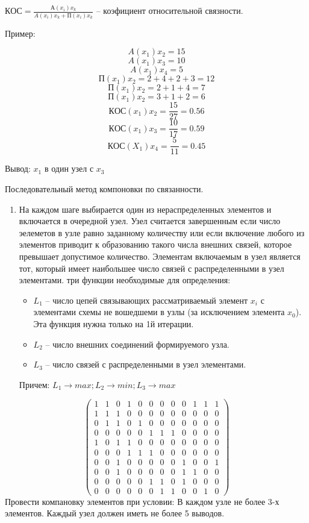 \documentclass{article}
\begin{document}
	$КОС = \frac{А (x_i) x_k}{A (x_i) x_k + П (x_i) x_k} $ -- коэфициент относительной связности.
	

	Пример:

	$$
	A (x_1) x_2 = 15
	$$
	$$
	A(x_1) x_3 = 10
	$$
	$$
	A(x_1) x_4 = 5
	$$
	$$
	П(x_1) x_2 = 2 + 4 + 2 + 3 = 12
	$$
	$$
	П (x_1) x_2 = 2 + 1 + 4 = 7
	$$
	$$
	П (x_1) x_2 = 3 + 1 + 2 = 6
	$$
	$$
	КОС (x_1) x_2 = \frac{15}{27} = 0.56
	$$
	$$
	КОС (x_1) x_3 = \frac{10}{17} = 0.59
	$$
	$$
	КОС (X_1) x_4 = \frac{5}{11} = 0.45
	$$

	Вывод: $x_1$ в один узел с $x_3$

	Последовательный метод компоновки по связанности.

	\begin{enumerate}
		\item На каждом шаге выбирается один из нераспределенных элементов и включается в очередной узел. Узел считается завершенным если число эелеметов в узле равно заданному количеству или если включение любого из элементов приводит к образованию такого числа внешних связей, которое превышает допустимое количество. Элементам включаемым в узел является тот, который имеет наибольшее число связей с распределенными в узел элементами. три функции необходимые для определения:
		\begin{itemize}
			\item $L_1$ -- число цепей связывающих рассматриваемый элемент $x_i$ с элементами схемы не вошедшеми в узлы (за исключением элемента $x_0$). Эта функция нужна только на 1й итерации.
			\item $L_2$ -- число внешних соединений формируемого узла.
			\item $L_3$ -- число связей с распределенными в узел элементами.
		\end{itemize}
		Причем: $L_1 \to max; L_2 \to min; L_3 \to max$
	\end{enumerate}
	$$
	\begin{pmatrix}
		1 & 1 & 0 & 1 & 0 & 0 & 0 & 0 & 0 & 1 & 1 & 1\\
		1 & 1 & 1 & 0 & 0 & 0 & 0 & 0 & 0 & 0 & 0 & 0\\
		0 & 1 & 1 & 0 & 1 & 0 & 0 & 0 & 0 & 0 & 0 & 0\\
		0 & 0 & 0 & 0 & 0 & 1 & 1 & 1 & 0 & 0 & 0 & 0\\
		1 & 0 & 1 & 1 & 0 & 0 & 0 & 0 & 0 & 0 & 0 & 0\\
		0 & 0 & 0 & 1 & 1 & 1 & 0 & 0 & 0 & 0 & 0 & 0\\
		0 & 0 & 1 & 0 & 0 & 0 & 0 & 0 & 1 & 0 & 0 & 1\\
		0 & 0 & 1 & 0 & 0 & 0 & 0 & 0 & 1 & 1 & 0 & 0\\
		0 & 0 & 0 & 0 & 0 & 1 & 1 & 0 & 1 & 0 & 0 & 0\\
		0 & 0 & 0 & 0 & 0 & 0 & 1 & 1 & 0 & 0 & 1 & 0
	\end{pmatrix}
	$$	
	Провести компановку элементов при условии:
	В каждом узле не более 3-х элементов. Каждый узел должен иметь не более 5 выводов.
\end{document}
